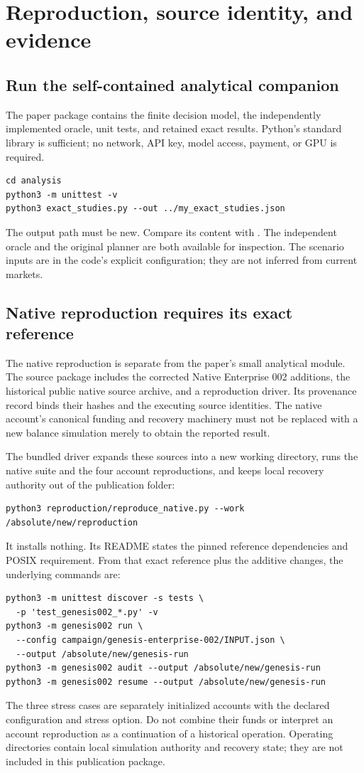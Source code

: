 \documentclass[11pt,letterpaper]{article}
\theoremstyle{remark}\newtheorem{remark}{Remark}[section]
\newcommand{\sourcefile}[1]{\texttt{\path{#1}}}
\begin{document}
\section{Reproduction, source identity, and evidence}
\subsection{Run the self-contained analytical companion}
The paper package contains the finite decision model, the independently implemented oracle, unit tests, and retained exact results. Python's standard library is sufficient; no network, API key, model access, payment, or GPU is required.
\begin{lstlisting}
cd analysis
python3 -m unittest -v
python3 exact_studies.py --out ../my_exact_studies.json
\end{lstlisting}
The output path must be new. Compare its content with \sourcefile{evidence/exact_studies.json}. The independent oracle and the original planner are both available for inspection. The scenario inputs are in the code's explicit configuration; they are not inferred from current markets.

\subsection{Native reproduction requires its exact reference}
The native reproduction is separate from the paper's small analytical module. The source package includes the corrected Native Enterprise 002 additions, the historical public native source archive, and a reproduction driver. Its provenance record binds their hashes and the executing source identities. The native account's canonical funding and recovery machinery must not be replaced with a new balance simulation merely to obtain the reported result.

The bundled driver expands these sources into a new working directory, runs the native suite and the four account reproductions, and keeps local recovery authority out of the publication folder:
\begin{lstlisting}
python3 reproduction/reproduce_native.py --work /absolute/new/reproduction
\end{lstlisting}
It installs nothing. Its README states the pinned reference dependencies and POSIX requirement. From that exact reference plus the additive changes, the underlying commands are:
\begin{lstlisting}
python3 -m unittest discover -s tests \
  -p 'test_genesis002_*.py' -v
python3 -m genesis002 run \
  --config campaign/genesis-enterprise-002/INPUT.json \
  --output /absolute/new/genesis-run
python3 -m genesis002 audit --output /absolute/new/genesis-run
python3 -m genesis002 resume --output /absolute/new/genesis-run
\end{lstlisting}
The three stress cases are separately initialized accounts with the declared configuration and stress option. Do not combine their funds or interpret an account reproduction as a continuation of a historical operation. Operating directories contain local simulation authority and recovery state; they are not included in this publication package.
\end{document}
